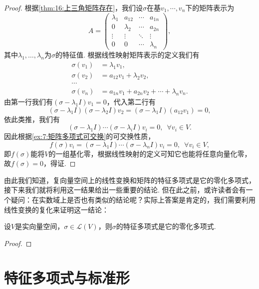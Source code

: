 \begin{enumerate}
          \begin{proof}
            根据\autoref{thm:16:上三角矩阵存在}，我们设$\sigma$在基$v_1,\cdots,v_n$下的矩阵表示为
            \[A=\begin{pmatrix}
                    \lambda_1 & a_{12} & \cdots & a_{1n} \\
                    0 & \lambda_2 & \cdots & a_{2n} \\
                    \vdots & \vdots & \ddots & \vdots \\
                    0 & 0 & \cdots & \lambda_n
                \end{pmatrix},\]
            其中$\lambda_1,\ldots,\lambda_n$为$\sigma$的特征值. 根据线性映射矩阵表示的定义我们有
            \begin{align*}
                \sigma(v_1)&=\lambda_1v_1,\\
                \sigma(v_2)&=a_{12}v_1+\lambda_2v_2,\\
                \cdots\\
                \sigma(v_n)&=a_{1n}v_1+a_{2n}v_2+\cdots+\lambda_nv_n.
            \end{align*}
            由第一行我们有$(\sigma-\lambda_1 I)v_1=0$，代入第二行有
            \[(\sigma-\lambda_1 I)(\sigma-\lambda_2 I)v_2=(\sigma-\lambda_1 I)(a_{12}v_1)=0,\]
            依此类推，我们有
            \[(\sigma-\lambda_1 I)\cdots(\sigma-\lambda_i I)v_i=0,\enspace\forall v_i\in V.\]
            因此根据\autoref{ex:7:矩阵多项式可交换}的可交换性质，
            \[f(\sigma)v_i=(\sigma-\lambda_1 I)\cdots(\sigma-\lambda_n I)v_i=0,\enspace\forall v_i\in V,\]
            即$f(\sigma)$能将$V$的一组基化零，根据线性映射的定义可知它也能将任意向量化零，故$f(\sigma)=0$，得证.
          \end{proof}
\end{enumerate}

由此我们知道，复向量空间上的线性变换和矩阵的特征多项式是它的零化多项式，接下来我们就将利用这一结果给出一些重要的结论. 但在此之前，或许读者会有一个疑问：在实数域上是否也有类似的结论呢？实际上答案是肯定的，我们需要利用线性变换的复化来证明这一结论：
\begin{theorem}
    设$V$是实向量空间，$\sigma\in \mathcal{L}(V)$，则$\sigma$的特征多项式是它的零化多项式.
\end{theorem}
\begin{proof}

\end{proof}

\section{特征多项式与标准形}
